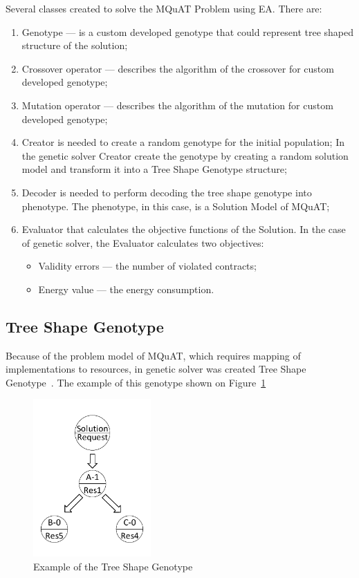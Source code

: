 Several classes created to solve the MQuAT Problem using EA. There are:

\begin{enumerate}
	\item Genotype — is a custom developed genotype that could represent tree shaped structure of the solution;
	\item Crossover operator — describes the algorithm of the crossover for custom developed genotype;
	\item Mutation operator — describes the algorithm of the mutation for custom developed genotype;
	\item Creator is needed to create a random genotype for the initial population;
	In the genetic solver Creator create the genotype by creating a random solution model and transform it into a Tree Shape Genotype structure;
	\item Decoder is needed to perform decoding the tree shape genotype into phenotype. The phenotype, in this case, is a Solution Model of MQuAT;
	\item Evaluator that calculates the objective functions of the Solution. In the case of genetic solver, the Evaluator calculates two objectives: 
	
	\begin{itemize}
		\item Validity errors — the number of violated contracts;
		\item Energy value — the energy consumption.
	\end{itemize}
	
\end{enumerate}

\subsection{Tree Shape Genotype}

Because of the problem model of MQuAT, which requires mapping of implementations to resources, in genetic solver was created Tree Shape Genotype~\cite{ahmad18}.
The example of this genotype shown on Figure~\ref{fig:TreeShapeGenotypeExample}

\begin{figure}
	\centering
	\includegraphics[width=0.4\textwidth]{images/TreeShapeGenotypeExample.pdf}
	\caption[Example of the Tree Shape Genotype]{Example of the Tree Shape Genotype}
	\label{fig:TreeShapeGenotypeExample}
\end{figure}


